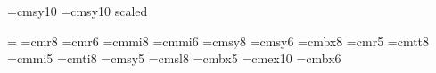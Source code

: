 \voffset=-25pt
\hoffset=-10pt

\def\fuzzy#1{\setbox0=\hbox{#1}%
  \kern-.025em\copy0\kern-\wd0
  \kern.05em\copy0\kern-\wd0
  \kern-.025em\raise.0433em\box0 }

\def\undertext#1{$\underline{\hbox{#1}}$}
\def\crta{\vrule height1.41ex depth-1.27ex width0.34em}
\def\dj{d\kern-0.36em\crta}
\def\Crta{\vrule height1ex depth-0.86ex width0.4em}
\def\Dj{D\kern-0.73em\Crta\kern0.33em}
\font\cal=cmsy10
\def\DJ{\cal D\kern-0.73em\Crta\kern0.33em}
\font\calcal=cmsy10 scaled 


\overfullrule=0cm
\newtoks\footfont \footfont={\eightpoint}
\font\eightrm=cmr8      \font\sixrm=cmr6
\font\eighti=cmmi8      \font\sixi=cmmi6
\font\eightsy=cmsy8     \font\sixsy=cmsy6
\font\eightbf=cmbx8     \font\fiverm=cmr5
\font\eighttt=cmtt8     \font\fivei=cmmi5
\font\eightit=cmti8     \font\fivesy=cmsy5
\font\eightsl=cmsl8     \font\fivebf=cmbx5
\font\tenex=cmex10      \font\sixbf=cmbx6
\newskip\ttglue
\def\eightpoint{\def\rm{\fam0\eightrm}
\textfont0=\eightrm     \scriptfont0=\sixrm     \scriptscriptfont0=\fiverm
\textfont1=\eighti      \scriptfont1=\sixi      \scriptscriptfont1=\fivei
\textfont2=\eightsy     \scriptfont2=\sixsy     \scriptscriptfont2=\fivesy
\textfont3=\tenex       \scriptfont3=\tenex     \scriptscriptfont3=\tenex
\textfont\itfam=\eightit        \def\it{\fam\itfam\eightit}
\textfont\slfam=\eightsl        \def\sl{\fam\slfam\eightsl}
\textfont\ttfam=\eighttt        \def\tt{\fam\ttfam\eighttt}
\textfont\bffam=\eightbf        \scriptfont\bffam=\sixbf
\scriptscriptfont\bffam=\fivebf \def\bf{\fam\bffam\eightbf}
\tt \ttglue=.5em plus .25em minus.15em
\normalbaselineskip=9pt
\footfont={\eightpoint}
\setbox\strutbox=\hbox{\vrule height7pt depth2pt  width0pt}
\let\sc=\sixrm \let\big=\eightbig \normalbaselines\rm}

\def\tenpoint{\def\rm{\fam0\tenrm}
\textfont0=\tenrm       \scriptfont0=\sevenrm   \scriptscriptfont0=\fiverm
\textfont1=\teni        \scriptfont1=\seveni    \scriptscriptfont1=\fivei
\textfont2=\tensy       \scriptfont2=\sevensy   \scriptscriptfont2=\fivesy
\textfont3=\tenex       \scriptfont3=\tenex     \scriptscriptfont3=\tenex
\textfont\itfam=\tenit  \def\it{\fam\itfam\tenit}
\textfont\slfam=\tensl  \def\sl{\fam\slfam\tensl}
\textfont\ttfam=\tentt  \def\tt{\fam\ttfam\tentt}
\textfont\bffam=\tenbf  \scriptfont\bffam=\sixbf
\scriptscriptfont\bffam=\fivebf \def\bf{\fam\bffam\tenbf}
\tt \ttglue=.5em plus .25em minus.15em
\normalbaselineskip=9pt
\footfont={\eightpoint}
\setbox\strutbox=\hbox{\vrule height8.5pt depth3.5pt  width0pt}
\let\sc=\eightrm \let\big=\tenbig \normalbaselines\rm}


